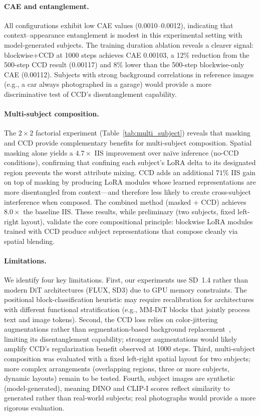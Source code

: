 \documentclass{article}
\begin{document}
\paragraph{CAE and entanglement.}
All configurations exhibit low CAE values (0.0010--0.0012), indicating that context--appearance entanglement is modest in this experimental setting with model-generated subjects.
The training duration ablation reveals a clearer signal: blockwise+CCD at 1000 steps achieves CAE 0.00103, a 12\% reduction from the 500-step CCD result (0.00117) and 8\% lower than the 500-step blockwise-only CAE (0.00112).
Subjects with strong background correlations in reference images (e.g., a car always photographed in a garage) would provide a more discriminative test of CCD's disentanglement capability.

\paragraph{Multi-subject composition.}
The $2 \times 2$ factorial experiment (Table~\ref{tab:multi_subject}) reveals that masking and CCD provide complementary benefits for multi-subject composition.
Spatial masking alone yields a $4.7\times$ IIS improvement over na\"ive inference (no-CCD conditions), confirming that confining each subject's LoRA delta to its designated region prevents the worst attribute mixing.
CCD adds an additional $71\%$ IIS gain on top of masking by producing LoRA modules whose learned representations are more disentangled from context---and therefore less likely to create cross-subject interference when composed.
The combined method (masked + CCD) achieves $8.0\times$ the baseline IIS.
These results, while preliminary (two subjects, fixed left-right layout), validate the core compositional principle: blockwise LoRA modules trained with CCD produce subject representations that compose cleanly via spatial blending.

\paragraph{Limitations.}
We identify four key limitations.
First, our experiments use SD~1.4 rather than modern DiT architectures (FLUX, SD3) due to GPU memory constraints.
The positional block-classification heuristic may require recalibration for architectures with different functional stratification (e.g., MM-DiT blocks that jointly process text and image tokens).
Second, the CCD loss relies on color-jittering augmentations rather than segmentation-based background replacement~\citep{kirillov2023segment}, limiting its disentanglement capability; stronger augmentations would likely amplify CCD's regularization benefit observed at 1000 steps.
Third, multi-subject composition was evaluated with a fixed left-right spatial layout for two subjects; more complex arrangements (overlapping regions, three or more subjects, dynamic layouts) remain to be tested.
Fourth, subject images are synthetic (model-generated), meaning DINO and CLIP-I scores reflect similarity to generated rather than real-world subjects; real photographs would provide a more rigorous evaluation.
\end{document}
